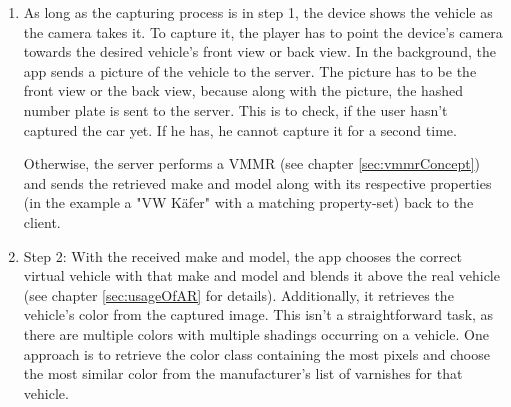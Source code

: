 \begin{enumerate}
  \item As long as the capturing process is in step 1, the device shows the vehicle as the camera takes it. To capture it, the player has to point the device's camera towards the desired vehicle's front view or back view. In the background, the app sends a picture of the vehicle to the server. The picture has to be the front view or the back view, because along with the picture, the hashed number plate is sent to the server. This is to check, if the user hasn't captured the car yet. If he has, he cannot capture it for a second time.

Otherwise, the server performs a VMMR (see chapter \ref{sec:vmmrConcept}) and sends the retrieved make and model along with its respective properties (in the example a "VW K\"afer" with a matching property-set) back to the client.
  \item Step 2: With the received make and model, the app chooses the correct virtual vehicle with that make and model and blends it above the real vehicle (see chapter \ref{sec:usageOfAR} for details). Additionally, it retrieves the vehicle's color from the captured image. This isn't a straightforward task, as there are multiple colors with multiple shadings occurring on a vehicle. One approach is to retrieve the color class containing the most pixels and choose the most similar color from the manufacturer's list of varnishes for that vehicle.


\end{enumerate}
